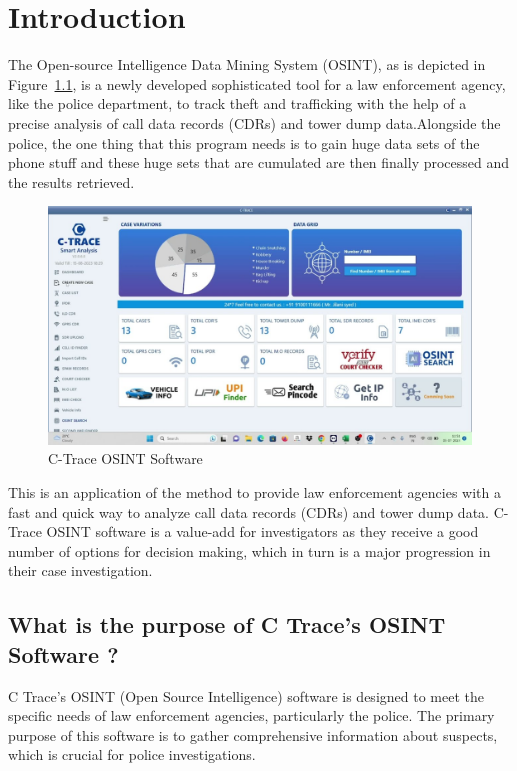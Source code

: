 \chapter{Introduction}\label{ch:introduction}
\justify

The Open-source Intelligence Data Mining System (OSINT), as is depicted in Figure~\ref{fig:CTraceOSINTSoftware}, is a newly developed sophisticated tool for a law enforcement agency, like the police department, to track theft and trafficking with the help of a precise analysis of call data records (CDRs) and tower dump data.Alongside the police, the one thing that this program needs is to gain huge data sets of the phone stuff and these huge sets that are cumulated are then finally processed and the results retrieved.

\begin{figure}
    \centering
    \includegraphics[width=1\linewidth]{Media/maxresdefault}
    \caption{C-Trace OSINT Software}
    \label{fig:CTraceOSINTSoftware}
\end{figure}

This is an application of the method to provide law enforcement agencies with a fast and quick way to analyze call data records (CDRs) and tower dump data.
C-Trace OSINT software is a value-add for investigators as they receive a good number of options for decision making, which in turn is a major progression in their case investigation.


\section{What is the purpose of C Trace's OSINT Software ?}\label{sec:what-is-the-purpose-of-c-trace's-osint-software-?}

C Trace's OSINT (Open Source Intelligence) software is designed to meet the specific needs of law enforcement agencies, particularly the police. The primary purpose of this software is to gather comprehensive information about suspects, which is crucial for police investigations.

